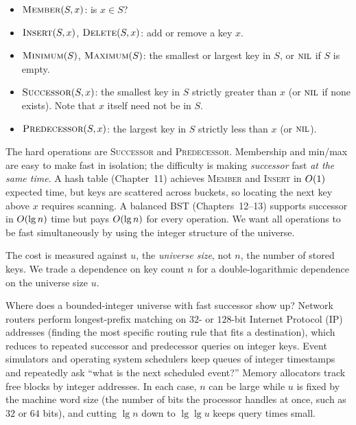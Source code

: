 \begin{itemize}
  \item $\textsc{Member}(S, x)$: is $x \in S$?
  \item $\textsc{Insert}(S, x)$, $\textsc{Delete}(S, x)$: add or remove a key $x$.
  \item $\textsc{Minimum}(S)$, $\textsc{Maximum}(S)$: the smallest or largest key in $S$,
        or $\textsc{nil}$ if $S$ is empty.
  \item $\textsc{Successor}(S, x)$: the smallest key in $S$ strictly greater
        than $x$ (or $\textsc{nil}$ if none exists). Note that $x$ itself need not be in $S$.
  \item $\textsc{Predecessor}(S, x)$: the largest key in $S$ strictly less than $x$ (or $\textsc{nil}$).
\end{itemize}

The hard operations are \textsc{Successor} and \textsc{Predecessor}. Membership
and min/max are easy to make fast in isolation; the difficulty is making
\emph{successor} fast \emph{at the same time}. A hash table (Chapter~11) achieves
\textsc{Member} and \textsc{Insert} in $O(1)$ expected time, but keys are
scattered across buckets, so locating the next key above $x$
requires scanning. A balanced BST (Chapters~12--13) supports successor in $O(\lg n)$ time
but pays $O(\lg n)$ for every operation. We want all operations to be fast
simultaneously by using the integer structure of the universe.

\begin{focusbox}
The cost is measured against $u$, the \emph{universe size}, not $n$, the number
of stored keys. We trade a dependence on key count
$n$ for a double-logarithmic dependence on the universe size $u$.
\end{focusbox}

\begin{aestheticbox}
Where does a bounded-integer universe with fast successor show up?
Network routers perform longest-prefix matching on $32$- or $128$-bit Internet Protocol (IP)
addresses (finding the most specific routing rule that fits a destination), which reduces to repeated successor and predecessor queries on integer
keys. Event simulators and operating system schedulers keep queues of integer
timestamps and repeatedly ask ``what is the next scheduled event?'' Memory
allocators track free blocks by integer addresses. In each case, $n$ can be
large while $u$ is fixed by the machine word size (the number of bits the processor handles at once, such as $32$ or $64$ bits), and cutting $\lg n$ down to
$\lg\lg u$ keeps query times small.
\end{aestheticbox}

